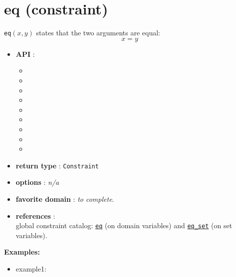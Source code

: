 \label{eq}
\hypertarget{eq}{}

\section{eq (constraint)}\label{eq:eqconstraint}\hypertarget{eq:eqconstraint}{}
\begin{notedef}
  \texttt{eq}$(x,y)$ states that the two arguments are equal:
$$x = y$$
\end{notedef}

\begin{itemize}
	\item \textbf{API} :
	\begin{itemize}
		\item {}
		\item {}
		\item {}
		\item {}
		\item {}
		\item {}
		\item {}
		\item {}
		\item {}
	\end{itemize}
	\item \textbf{return type} : \texttt{Constraint}
	\item \textbf{options} : \emph{n/a}
	\item \textbf{favorite domain} : \emph{to complete}.
	\item \textbf{references} :\\
      global constraint catalog: \href{http://www.emn.fr/x-info/sdemasse/gccat/Ceq.html}{\tt eq} (on domain variables) and \href{http://www.emn.fr/x-info/sdemasse/gccat/Ceq_set.html}{\tt eq\_set} (on set variables). 
\end{itemize}

\textbf{Examples:}
\begin{itemize}
	\item example1:
\end{itemize}

